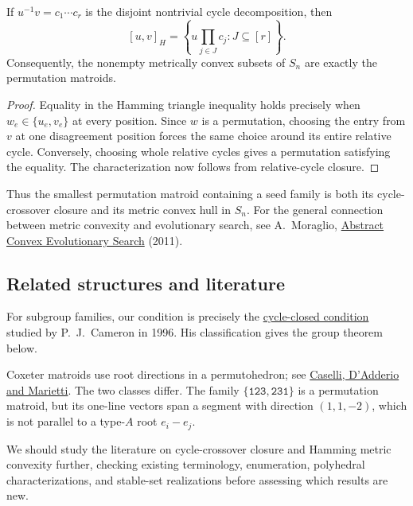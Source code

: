 \begin{proposition}
If $u^{-1}v=c_1\dotsm c_r$ is the disjoint nontrivial cycle
decomposition, then
\[
 [u,v]_H=
 \left\{u\prod_{j\in J}c_j:J\subseteq[r]\right\}.
\]
Consequently, the nonempty metrically convex subsets of $S_n$ are
exactly the permutation matroids.
\end{proposition}

\begin{proof}
Equality in the Hamming triangle inequality holds precisely when
$w_e\in\{u_e,v_e\}$ at every position. Since $w$ is a permutation,
choosing the entry from $v$ at one disagreement position forces the
same choice around its entire relative cycle. Conversely, choosing
whole relative cycles gives a permutation satisfying the equality.
The characterization now follows from relative-cycle closure.
\end{proof}

Thus the smallest permutation matroid containing a seed family is both
its cycle-crossover closure and its metric convex hull in $S_n$.
For the general connection between metric convexity and evolutionary
search, see A.~Moraglio,
\href{https://eden.dei.uc.pt/~moraglio/foga24e-moraglio.pdf}{Abstract
Convex Evolutionary Search} (2011).

\subsection[permutationLiterature]{Related structures and literature}

For subgroup families, our condition is precisely the
\href{#permutationGroups}{cycle-closed condition} studied by
P.~J.~Cameron in 1996. His classification gives the group theorem below.

\begin{remark}
Coxeter matroids use root directions in a permutohedron; see
\href{https://iris.univpm.it/bitstream/11566/294024/9/CaselliDadderioMariettiREVISED.pdf}{Caselli,
D'Adderio and Marietti}. The two classes differ. The family
$\{\mathtt{123},\mathtt{231}\}$ is a permutation matroid, but its
one-line vectors span a segment with direction $(1,1,-2)$, which is
not parallel to a type-$A$ root $e_i-e_j$.
\end{remark}

\begin{remark}
We should study the literature on cycle-crossover closure and Hamming
metric convexity further, checking existing terminology, enumeration,
polyhedral characterizations, and stable-set realizations before
assessing which results are new.
\end{remark}

